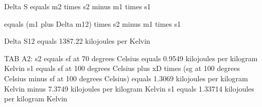Delta S equals m2 times s2 minus m1 times s1  

equals (m1 plus Delta m12) times s2 minus m1 times s1  

Delta S12 equals 1387.22 kilojoules per Kelvin  

TAB A2:  
s2 equals sf at 70 degrees Celsius equals 0.9549 kilojoules per kilogram Kelvin  
s1 equals sf at 100 degrees Celsius plus xD times (sg at 100 degrees Celsius minus sf at 100 degrees Celsius)  
equals 1.3069 kilojoules per kilogram Kelvin minus 7.3749 kilojoules per kilogram Kelvin  
s1 equals 1.33714 kilojoules per kilogram Kelvin